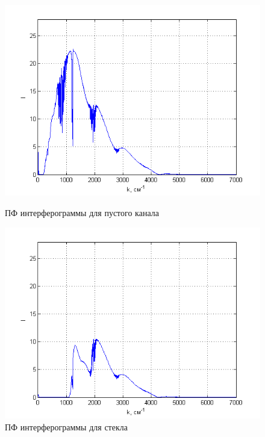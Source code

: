 \documentclass[a4paper,12pt]{article} %
\begin{document}
    \begin{figure}[h!]
        \begin{center}
            \begin{minipage}[h!]{0.4\linewidth}
                \includegraphics[width=1.2\linewidth]{5.png}
                \caption{ПФ интерферограммы для пустого канала}
                \label{picture_5}
            \end{minipage}
            \hfill
            \begin{minipage}[h!]{0.4\linewidth}
                \includegraphics[width=1.2\linewidth]{6.png}
                \caption{ПФ интерферограммы для стекла}
                \label{picture_6}
            \end{minipage}

\end{center}
\end{figure}
\end{document}
